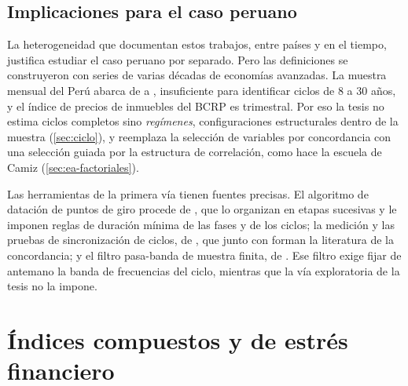 \subsection{Implicaciones para el caso peruano}

La heterogeneidad que documentan estos trabajos, entre países y en el tiempo, justifica estudiar
el caso peruano por separado. Pero las definiciones se construyeron con series de varias décadas
de economías avanzadas. La muestra mensual del Perú abarca de \anioInicioDatos{} a \anioFinDatos{}, insuficiente para
identificar ciclos de 8 a 30 años, y el índice de precios de inmuebles del BCRP es trimestral. Por
eso la tesis no estima ciclos completos sino \emph{regímenes}, configuraciones estructurales
dentro de la muestra (\cref{sec:ciclo}), y reemplaza la selección de variables por concordancia
con una selección guiada por la estructura de correlación, como hace la escuela de Camiz
(\cref{sec:ea-factoriales}).

Las herramientas de la primera vía tienen fuentes precisas. El algoritmo de datación de puntos de
giro procede de \textcite{bry_boschan_1971}, que lo organizan en etapas sucesivas y le imponen
reglas de duración mínima de las fases y de los ciclos; la medición y las pruebas de
sincronización de ciclos, de \textcite{harding_pagan_2006}, que junto con
\textcite{harding_pagan_2002} forman la literatura de la concordancia; y el filtro pasa-banda de
muestra finita, de \textcite{christiano_fitzgerald_2003}. Ese filtro exige fijar de antemano la
banda de frecuencias del ciclo, mientras que la vía exploratoria de la tesis no la impone.

\section{Índices compuestos y de estrés financiero}
\label{sec:ea-indices}

